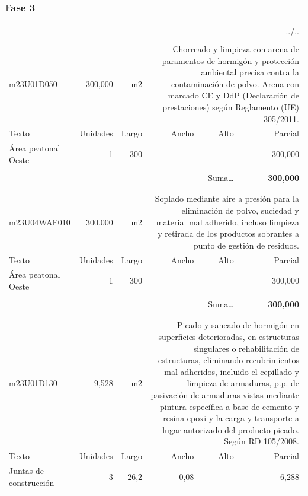 \documentclass{book}%
\begin{document}
\subsubsection{Fase 3}%
\begin{longtable}{lrrrrr}%
\multicolumn{6}{r}{../..}\\%
\endfoot%
\endlastfoot%
&&&&&\\%
m23U01D050&   300,000& m2&\multicolumn{3}{p{6cm}}{\scriptsize Chorreado y limpieza con arena de paramentos de hormigón y protección ambiental precisa contra la contaminación de polvo. Arena con marcado CE y DdP (Declaración de prestaciones) según Reglamento (UE) 305/2011.\normalsize}\\%
Texto&Unidades&Largo&Ancho&Alto&Parcial\\%
\hline%
\multicolumn{1}{p{3.5cm}}{Área peatonal Oeste}&1&300&&&   300,000\\%
&&&&&\\%
\multicolumn{5}{r}{Suma\ldots}&\textbf{   300,000}\\%
\hline%
&&&&&\\%
&&&&&\\%
m23U04WAF010&   300,000& m2&\multicolumn{3}{p{6cm}}{\scriptsize Soplado mediante aire a presión para la eliminación de polvo, suciedad y material mal adherido, incluso limpieza y retirada de los productos sobrantes a punto de gestión de residuos.\normalsize}\\%
Texto&Unidades&Largo&Ancho&Alto&Parcial\\%
\hline%
\multicolumn{1}{p{3.5cm}}{Área peatonal Oeste}&1&300&&&   300,000\\%
&&&&&\\%
\multicolumn{5}{r}{Suma\ldots}&\textbf{   300,000}\\%
\hline%
&&&&&\\%
&&&&&\\%
m23U01D130&     9,528& m2&\multicolumn{3}{p{6cm}}{\scriptsize Picado y saneado de hormigón en superficies deterioradas, en estructuras singulares o rehabilitación de estructuras, eliminando recubrimientos mal adheridos, incluido el cepillado y limpieza de armaduras, p.p. de pasivación de armaduras vistas mediante pintura específica a base de cemento y resina epoxi y la carga y transporte a lugar autorizado del producto picado. Según RD 105/2008.\normalsize}\\%
Texto&Unidades&Largo&Ancho&Alto&Parcial\\%
\hline%
\multicolumn{1}{p{3.5cm}}{Juntas de construcción}&3&26,2&0,08&&     6,288\\%

\end{longtable}
\end{document}
